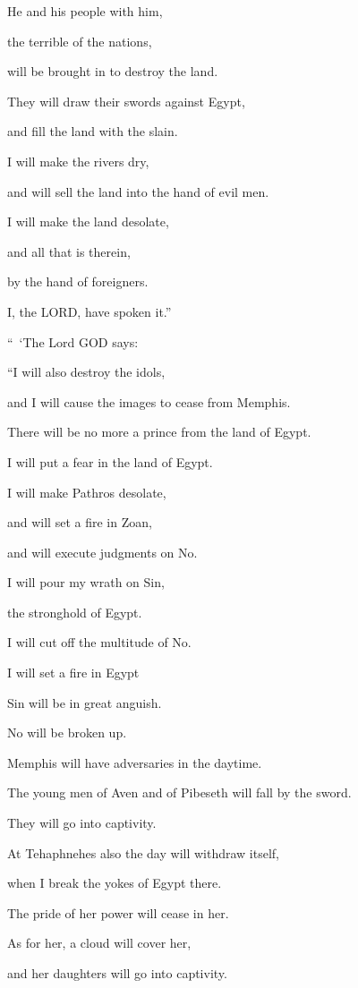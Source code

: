 \myverse{}He and his people with him,

the terrible of the nations,

will be brought in to destroy the land.

They will draw their swords against Egypt,

and fill the land with the slain.

\myverse{}I will make the rivers dry,

and will sell the land into the hand of evil men.

I will make the land desolate,

and all that is therein,

by the hand of foreigners.

I, the LORD, have spoken it.”

\myverse{}“ ‘The Lord GOD says:

“I will also destroy the idols,

and I will cause the images to cease from Memphis.

There will be no more a prince from the land of Egypt.

I will put a fear in the land of Egypt.

\myverse{}I will make Pathros desolate,

and will set a fire in Zoan,

and will execute judgments on No.

\myverse{}I will pour my wrath on Sin,

the stronghold of Egypt.

I will cut off the multitude of No.

\myverse{}I will set a fire in Egypt

Sin will be in great anguish.

No will be broken up.

Memphis will have adversaries in the daytime.

\myverse{}The young men of Aven and of Pibeseth will fall by the sword.

They will go into captivity.

\myverse{}At Tehaphnehes also the day will withdraw itself,

when I break the yokes of Egypt there.

The pride of her power will cease in her.

As for her, a cloud will cover her,

and her daughters will go into captivity.

